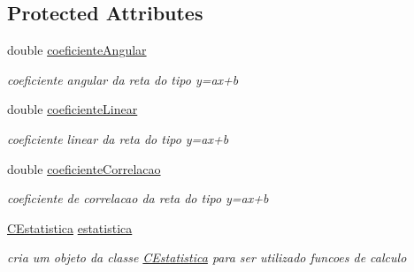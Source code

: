 \subsection*{Protected Attributes}
\begin{DoxyCompactItemize}
\item 
\hypertarget{classCAjusteCurvaMinimosQuadrados_a9acb25b94e4197b4438354a3cc0149d8}{double \hyperlink{classCAjusteCurvaMinimosQuadrados_a9acb25b94e4197b4438354a3cc0149d8}{coeficiente\-Angular}}\label{classCAjusteCurvaMinimosQuadrados_a9acb25b94e4197b4438354a3cc0149d8}

\begin{DoxyCompactList}\small\item\em coeficiente angular da reta do tipo y=ax+b \end{DoxyCompactList}\item 
\hypertarget{classCAjusteCurvaMinimosQuadrados_a773d82a76e8328f285dad4d1272cad53}{double \hyperlink{classCAjusteCurvaMinimosQuadrados_a773d82a76e8328f285dad4d1272cad53}{coeficiente\-Linear}}\label{classCAjusteCurvaMinimosQuadrados_a773d82a76e8328f285dad4d1272cad53}

\begin{DoxyCompactList}\small\item\em coeficiente linear da reta do tipo y=ax+b \end{DoxyCompactList}\item 
\hypertarget{classCAjusteCurvaMinimosQuadrados_acdac37bfab1829fa6594244b725b21be}{double \hyperlink{classCAjusteCurvaMinimosQuadrados_acdac37bfab1829fa6594244b725b21be}{coeficiente\-Correlacao}}\label{classCAjusteCurvaMinimosQuadrados_acdac37bfab1829fa6594244b725b21be}

\begin{DoxyCompactList}\small\item\em coeficiente de correlacao da reta do tipo y=ax+b \end{DoxyCompactList}\item 
\hypertarget{classCAjusteCurvaMinimosQuadrados_a5d05f026e862a7864a506fd44dda2a07}{\hyperlink{classCEstatistica}{C\-Estatistica} \hyperlink{classCAjusteCurvaMinimosQuadrados_a5d05f026e862a7864a506fd44dda2a07}{estatistica}}\label{classCAjusteCurvaMinimosQuadrados_a5d05f026e862a7864a506fd44dda2a07}

\begin{DoxyCompactList}\small\item\em cria um objeto da classe \hyperlink{classCEstatistica}{C\-Estatistica} para ser utilizado funcoes de calculo \end{DoxyCompactList}\end{DoxyCompactItemize}


